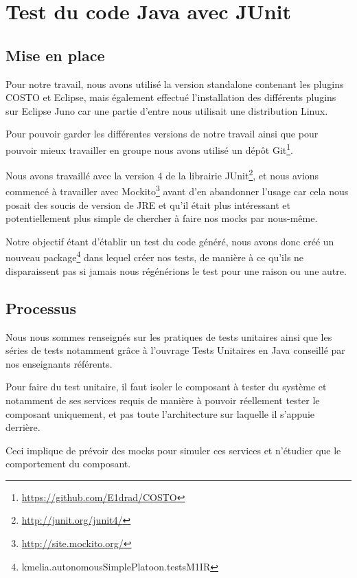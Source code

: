 \chapter{Test du code Java avec JUnit}
\label{chap:JUnit}

\section{Mise en place}
\label{sec:JUnitMiseEnPlace}
Pour notre travail, nous avons utilisé la version standalone contenant les plugins COSTO et Eclipse, mais également effectué l'installation des différents plugins sur Eclipse Juno car une partie d'entre nous utilisait une distribution Linux. 

Pour pouvoir garder les différentes versions de notre travail ainsi que pour pouvoir mieux travailler en groupe nous avons utilisé un dépôt Git\footnote{\url{https://github.com/E1drad/COSTO}}.

Nous avons travaillé avec la version 4 de la librairie JUnit\footnote{\url{http://junit.org/junit4/}}, et nous avions commencé à travailler avec Mockito\footnote{\url{http://site.mockito.org/}} avant d'en abandonner l'usage car cela nous posait des soucis de version de JRE  et qu'il était plus intéressant et potentiellement plus simple de chercher à faire nos mocks par nous-même.

Notre objectif étant d'établir un test du code généré, nous avons donc créé un nouveau package\footnote{kmelia.autonomousSimplePlatoon.testsM1IR} dans lequel créer nos tests, de manière à ce qu'ils ne disparaissent pas si jamais nous régénérions le test pour une raison ou une autre.

\clearpage
\section{Processus}
\label{sec:JUnitProcessus}

Nous nous sommes renseignés sur les pratiques de tests unitaires ainsi que les séries de tests notamment grâce à l'ouvrage Tests Unitaires en Java \cite{testUnit} conseillé par nos enseignants référents.

Pour faire du test unitaire, il faut isoler le composant à tester du système et notamment de ses services requis de manière à pouvoir réellement tester le composant uniquement, et pas toute l'architecture sur laquelle il s'appuie derrière.

Ceci implique de prévoir des mocks pour simuler ces services et n'étudier que le comportement du composant. 

